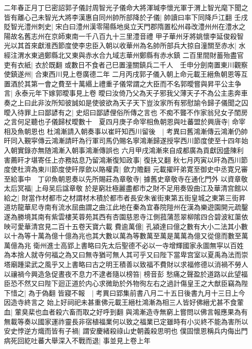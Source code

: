 二年春正月丁巳密詔郭子儀討周智光子儀命大將渾瑊李懷光軍于渭上智光麾下聞之皆有離心己未智光大將李漢惠自同州帥所部降於子儀|{
	帥讀曰率下同降戶江翻}
壬戌貶智光澧州刺史|{
	宋白曰澧州漢零陽縣地吳立天門郡隋置松州尋改澧州州在澧水之陽故名舊志州在京師東南一千八百九十三里澧音禮}
甲子華州牙將姚懷李延俊殺智光以其首來獻淮西節度使李忠臣入朝以收華州為名帥所部兵大掠自潼關至赤水|{
	水經注渭水東過鄭縣北又東與赤水合九域志華州鄭縣有赤水鎮}
二百里間財蓄殆盡官吏有衣紙|{
	衣於既翻}
或數日不食者己巳置潼關鎮兵二千人　壬申分劍南置東川觀察使鎮遂州|{
	合東西川見上卷廣德二年}
二月丙戌郭子儀入朝上命元載王縉魚朝恩等互置酒於其第一會之費至十萬緡上禮重子儀常謂之大臣而不名郭曖嘗與昇平公主争言|{
	永泰元年下嫁郭曖事見上卷}
曖曰汝倚乃父為天子邪我父薄天子不為公主恚奔車奏之上曰此非汝所知彼誠如是使彼欲為天子天下豈汝家所有邪慰諭令歸子儀聞之囚曖入待罪上曰鄙諺有之|{
	史炤曰鄙諺俚俗所傳之言也}
不痴不聾不作家翁兒女子閨房之言何足聽也子儀歸杖曖數十　夏四月庚子命宰相魚朝恩與吐蕃盟於興唐寺|{
	命宰相及魚朝恩也}
杜鴻漸請入朝奏事以崔旰知西川留後　|{
	考異曰舊鴻漸傳云鴻漸仍帥旰同入覲寜傳云鴻漸請旰為行軍司馬仍賜名寧鴻漸歸遂授寜西川節度使至十四年始入朝實錄亦無随鴻漸入朝事鴻漸傳誤也}
六月甲戌鴻漸來自成都廣為貢獻因盛陳利害薦旰才堪寄任上亦務姑息乃留鴻漸復知政事|{
	復扶又翻}
秋七月丙寅以旰為西川節度使杜濟為東川節度使旰厚歛以賂權貴|{
	歛力贍翻}
元載擢旰弟寛至御史中丞寛兄審至給事中　丁卯魚朝恩奏以先所賜莊為章敬寺|{
	據舊史章敬寺在通化門外}
以資章敬太后冥福|{
	上母吴后諡章敬}
於是窮壯極麗盡都市之財不足用奏毁曲江及華清宫館以給之|{
	財當作材都市之材謂材木積於都市者長安朱雀街東第五街皇城之東第三街昇道坊龍華尼寺南有流水屈曲謂之曲江此地在秦為宜春院隑州在漢為樂遊園開元疏鑿遂為勝境其南有紫雲樓芙蓉苑其西有杏園慈恩寺江側菰蒲䓤翠柳隂四合碧波紅蕖依映可愛華清宫見二百十五卷天寶六載}
費逾萬億|{
	孔潁達曰億之數有大小二法其小數以十為等十萬為億十億為兆也其大數以萬為等數萬至萬是萬萬為億又從億而數至萬萬億為兆}
衛州進士高郢上書略曰先太后聖德不必以一寺增輝國家永圖無寜以百姓為本捨人就寺何福之為又曰無寺猶可無人其可乎又曰陛下當卑宫室以夏禹為法而崇塔廟踵梁武之風乎又上書略曰古之明王積善以致福不費財以求福修德以消禍不勞人以禳禍今興造急促晝夜不息力不逮者隨以榜笞|{
	榜音彭}
愁痛之聲盈於道路以此望福臣恐不然又曰陛下迴正道於内心求微助於外物徇左右之過計傷皇王之大猷臣竊為陛下惜之|{
	為于偽翻}
皆寢不報　|{
	考異曰郢集前書八月二十五日後書九月十三日上今因造寺終言之}
始上好祠祀未甚重佛元載王縉杜鴻漸為相三人皆好佛縉尤甚不食葷血|{
	葷臭棐也血者殺六畜而取之好呼到翻}
與鴻漸造寺無窮上嘗問以佛言報應果為有無載等奏以國家運祚靈長非宿植福業何以致之福業已定雖時有小災終不能為害所以安史悖逆方熾而皆有子禍|{
	謂安慶緒殺祿山史朝義殺思明也}
僕固懷恩稱兵内侮出門病死回紇吐蕃大舉深入不戰而退|{
	事並見上卷上年}
